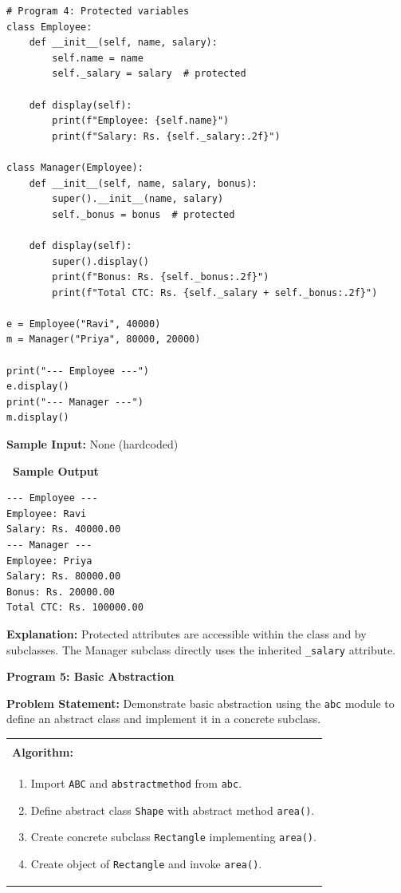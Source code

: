 \documentclass[12pt,a4paper]{article}
\makeatletter
\newcommand{\outhead}{\noindent\colorbox{cmrgreen!25}%
  {\textbf{\small\color{cmrdark}~Sample Output~}}\par\vspace{-1pt}}
\newenvironment{algobox}{%
  \par\vspace{4pt}%
  \noindent\begin{tabular}{@{}p{\linewidth}@{}}%
  \hline\\[-8pt]%
  \textbf{\color{blue!60!black}\small Algorithm:}\\[2pt]%
}{%
  \\[-4pt]\hline%
  \end{tabular}\par\vspace{4pt}%
}
\makeatother
\begin{document}
\begin{lstlisting}
# Program 4: Protected variables
class Employee:
    def __init__(self, name, salary):
        self.name = name
        self._salary = salary  # protected

    def display(self):
        print(f"Employee: {self.name}")
        print(f"Salary: Rs. {self._salary:.2f}")

class Manager(Employee):
    def __init__(self, name, salary, bonus):
        super().__init__(name, salary)
        self._bonus = bonus  # protected

    def display(self):
        super().display()
        print(f"Bonus: Rs. {self._bonus:.2f}")
        print(f"Total CTC: Rs. {self._salary + self._bonus:.2f}")

e = Employee("Ravi", 40000)
m = Manager("Priya", 80000, 20000)

print("--- Employee ---")
e.display()
print("--- Manager ---")
m.display()
\end{lstlisting}

\textbf{Sample Input:} None (hardcoded)

\outhead
\begin{lstlisting}[style=outputstyle]
--- Employee ---
Employee: Ravi
Salary: Rs. 40000.00
--- Manager ---
Employee: Priya
Salary: Rs. 80000.00
Bonus: Rs. 20000.00
Total CTC: Rs. 100000.00
\end{lstlisting}

\textbf{Explanation:} Protected attributes are accessible within the class and by subclasses. The Manager subclass directly uses the inherited \texttt{\_salary} attribute.

\vspace{0.5cm}

\textbf{Program 5: Basic Abstraction}

\textbf{Problem Statement:}
Demonstrate basic abstraction using the \texttt{abc} module to define an abstract class and implement it in a concrete subclass.

\begin{algobox}
\begin{enumerate}[label=Step \arabic*:]
  \item Import \texttt{ABC} and \texttt{abstractmethod} from \texttt{abc}.
  \item Define abstract class \texttt{Shape} with abstract method \texttt{area()}.
  \item Create concrete subclass \texttt{Rectangle} implementing \texttt{area()}.
  \item Create object of \texttt{Rectangle} and invoke \texttt{area()}.
\end{enumerate}
\end{algobox}
\end{document}

